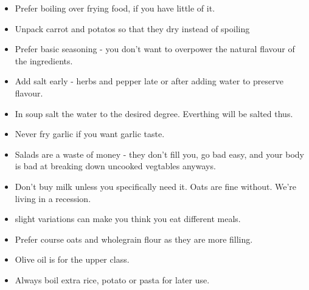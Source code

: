\begin{itemize}
    \item Prefer boiling over frying food, if you have little of it.
    \item Unpack carrot and potatos so that they dry instead of spoiling
    \item Prefer basic seasoning - you don't want to overpower the
        natural flavour
        of the ingredients.
    \item Add salt early - herbs and pepper late or after adding
        water to preserve flavour.
    \item In soup salt the water to the desired degree. Everthing will be salted
        thus.
    \item Never fry garlic if you want garlic taste.
    \item Salads are a waste of money - they don't fill you, go bad easy, and
        your body is bad at breaking down uncooked vegtables anyways.
    \item Don't buy milk unless you specifically need it. Oats
        are fine without. We're living in a recession.
    \item slight variations can make you think you eat different meals.
    \item Prefer course oats and wholegrain flour as they are more filling.
    \item Olive oil is for the upper class.
    \item Always boil extra rice, potato or pasta for later use.
\end{itemize}

\clearpage
